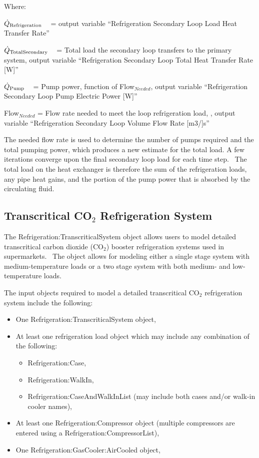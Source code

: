 Where:

\({\dot Q_{{\rm{Refrigeration}}}}\) ~ = output variable ``Refrigeration Secondary Loop Load Heat Transfer Rate''

\({\dot Q_{{\rm{TotalSecondary}}}}\) ~ = Total load the secondary loop transfers to the primary system, output variable ``Refrigeration Secondary Loop Total Heat Transfer Rate {[}W{]}''

\({\dot Q_{{\rm{Pump}}}}\) ~ = Pump power, function of Flow\(_{Needed}\), output variable ``Refrigeration Secondary Loop Pump Electric Power {[}W{]}''

Flow\(_{Needed}\) = Flow rate needed to meet the loop refrigeration load, , output variable ``Refrigeration Secondary Loop Volume Flow Rate {[}m3/{]}s''

The needed flow rate is used to determine the number of pumps required and the total pumping power, which produces a new estimate for the total load. A few iterations converge upon the final secondary loop load for each time step.~ The total load on the heat exchanger is therefore the sum of the refrigeration loads, any pipe heat gains, and the portion of the pump power that is absorbed by the circulating fluid.

\subsection{Transcritical CO\(_{2}\) Refrigeration System}\label{transcritical-co2-refrigeration-system}

The Refrigeration:TranscriticalSystem object allows users to model detailed transcritical carbon dioxide (CO\(_{2}\)) booster refrigeration systems used in supermarkets.~ The object allows for modeling either a single stage system with medium-temperature loads or a two stage system with both medium- and low-temperature loads.

The input objects required to model a detailed transcritical CO\(_{2}\) refrigeration system include the following:

\begin{itemize}
  \item One Refrigeration:TranscriticalSystem object,
  \item At least one refrigeration load object which may include any combination of the following:
  \begin{itemize}
    \item Refrigeration:Case,
    \item Refrigeration:WalkIn,
    \item Refrigeration:CaseAndWalkInList (may include both cases and/or walk-in cooler names),
  \end{itemize}
  \item At least one Refrigeration:Compressor object (multiple compressors are entered using a Refrigeration:CompressorList),
  \item One Refrigeration:GasCooler:AirCooled object,
\end{itemize}

